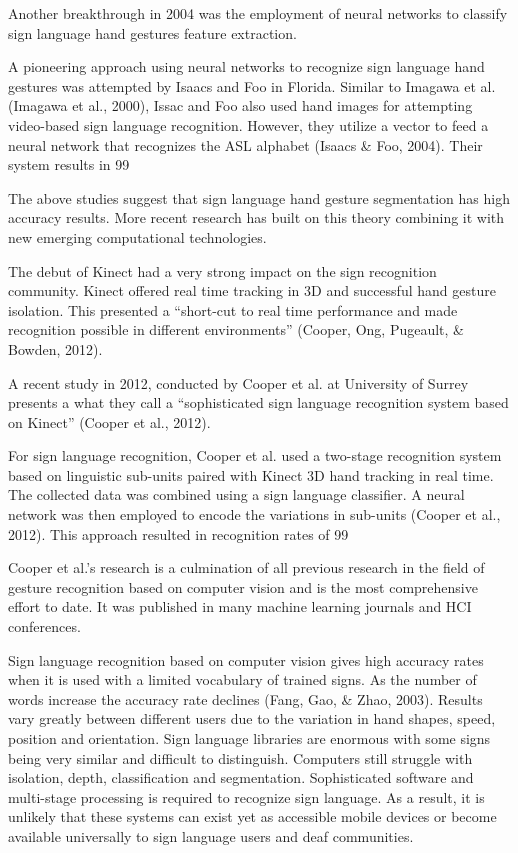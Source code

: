 Another breakthrough in 2004 was the employment of neural networks to classify sign language hand gestures feature extraction. 

A pioneering approach using neural networks to recognize sign language hand gestures was attempted by Isaacs and Foo in Florida. Similar to Imagawa et al. (Imagawa et al., 2000), Issac and Foo also used hand images for attempting video-based sign language recognition. However, they utilize a vector to feed a neural network that recognizes the ASL alphabet (Isaacs \& Foo, 2004). Their system results in 99%

The above studies suggest that sign language hand gesture segmentation has high accuracy results. More recent research has built on this theory combining it with new emerging computational technologies. 

The debut of Kinect had a very strong impact on the sign recognition community. Kinect offered real time tracking in 3D and successful hand gesture isolation. This presented a ``short-cut to real time performance and made recognition possible in different environments'' (Cooper, Ong, Pugeault, \& Bowden, 2012).

A recent study in 2012, conducted by Cooper et al. at University of Surrey presents a what they call a ``sophisticated sign language recognition system based on Kinect'' (Cooper et al., 2012).

For sign language recognition, Cooper et al. used a two-stage recognition system based on linguistic sub-units paired with Kinect 3D hand tracking in real time. The collected data was combined using a sign language classifier. A neural network was then employed to encode the variations in sub-units (Cooper et al., 2012). This approach resulted in recognition rates of 99%

Cooper et al.’s research is a culmination of all previous research in the field of gesture recognition based on computer vision and is the most comprehensive effort to date. It was published in many machine learning journals and HCI conferences. 

Sign language recognition based on computer vision gives high accuracy rates when it is used with a limited vocabulary of trained signs. As the number of words increase the accuracy rate declines (Fang, Gao, \& Zhao, 2003). Results vary greatly between different users due to the variation in hand shapes, speed, position and orientation. Sign language libraries are enormous with some signs being very similar and difficult to distinguish. Computers still struggle with isolation, depth, classification and segmentation. Sophisticated software and multi-stage processing is required to recognize sign language. As a result, it is unlikely that these systems can exist yet as accessible mobile devices or become available universally to sign language users and deaf communities. 

